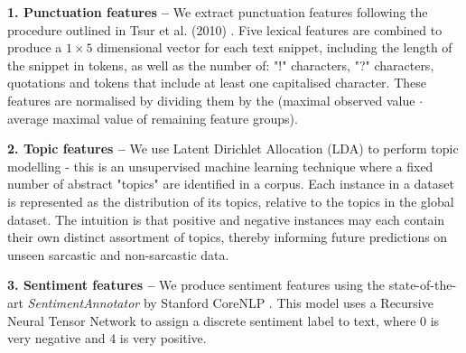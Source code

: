 \documentclass[12pt,a4paper]{article}
\begin{document}
\noindent \textbf{1. Punctuation features --} We extract punctuation features following the procedure outlined in Tsur et al. (2010) \cite{tsur2010icwsm}. Five lexical features are combined to produce a $ 1 \times 5 $ dimensional vector for each text snippet, including the length of the snippet in tokens, as well as the number of: "!" characters, "?" characters, quotations and tokens that include at least one capitalised character. These features are normalised by dividing them by the (maximal observed value $ \cdot $ average maximal value of remaining feature groups).\\\vspace{-5pt}


\noindent \textbf{2. Topic features --} We use Latent Dirichlet Allocation (LDA) to perform topic modelling - this is an unsupervised machine learning technique where a fixed number of abstract "topics" are identified in a corpus. Each instance in a dataset is represented as the distribution of its topics, relative to the topics in the global dataset. The intuition is that positive and negative instances may each contain their own distinct assortment of topics, thereby informing future predictions on unseen sarcastic and non-sarcastic data.\\\vspace{-5pt}

\noindent \textbf{3. Sentiment features --} We produce sentiment features using the state-of-the-art \textit{SentimentAnnotator} \cite{socher2013recursive} by Stanford CoreNLP \cite{manning2014stanford}. This model uses a Recursive Neural Tensor Network to assign a discrete sentiment label to text, where 0 is very negative and 4 is very positive.\\\vspace{-5pt}
\end{document}
